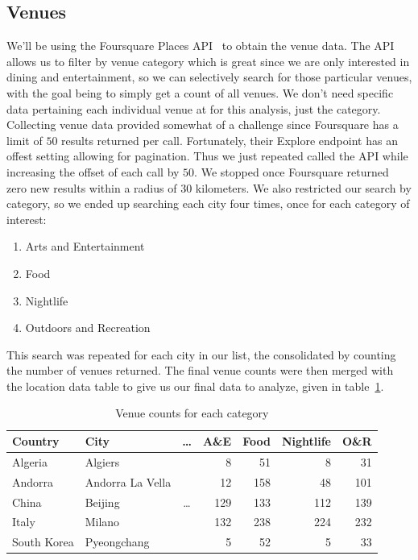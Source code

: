 \documentclass[
 reprint,
 amsmath,amssymb,
 aps,
prb,
floatfix
]{revtex4-2}
\begin{document}
    \subsection{Venues}
    We'll be using the Foursquare Places API~\cite{foursquare} to obtain the venue data. The API allows us to filter by venue category which is great since we are only interested in dining and entertainment, so we can selectively search for those particular venues, with the goal being to simply get a count of all venues. We don't need specific data pertaining each individual venue at for this analysis, just the category. Collecting venue data provided somewhat of a challenge since Foursquare has a limit of $50$ results returned per call. Fortunately, their Explore endpoint has an offest setting allowing for pagination. Thus we just repeated called the API while increasing the offset of each call by $50$. We stopped once Foursquare returned zero new results within a radius of $30$ kilometers. We also restricted our search by category, so we ended up searching each city four times, once for each category of interest:
    \begin{enumerate}[topsep=0pt,itemsep=-1ex,partopsep=1ex,parsep=1ex]
        \item Arts and Entertainment
        \item Food
        \item Nightlife
        \item Outdoors and Recreation
    \end{enumerate}
    This search was repeated for each city in our list, the consolidated by counting the number of venues returned. The final venue counts were then merged with the location data table to give us our final data to analyze, given in table~\ref{table_final}.
    \begin{table}[htb]
        \centering
        \begin{tabular}{ll|c|rrrr}
        Country & City & \ldots & A\&E & Food & Nightlife & O\&R \\
        \hline\hline
        Algeria&Algiers& & 8 & 51 & 8 & 31 \\
        Andorra&Andorra La Vella&& 12 & 158 & 48 & 101\\
        China&Beijing& \ldots& 129 & 133 & 112 & 139 \\
        Italy&Milano& & 132 & 238 & 224 & 232 \\
        South Korea&Pyeongchang& & 5 & 52 & 5 & 33
        \end{tabular}
        \caption{Venue counts for each category}
        \label{table_final}
    \end{table}
\end{document}
